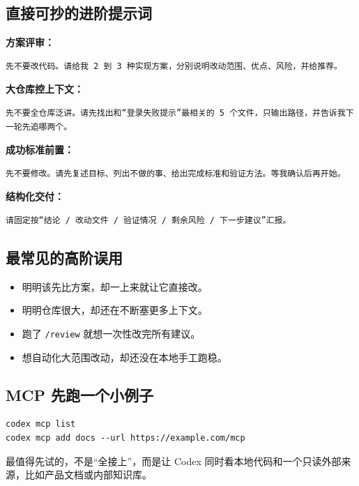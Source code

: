 \documentclass[UTF8,a4paper,11pt]{ctexart}
\begin{document}
\subsection{直接可抄的进阶提示词}

\textbf{方案评审：}
\begin{lstlisting}[style=prompt]
先不要改代码。请给我 2 到 3 种实现方案，分别说明改动范围、优点、风险，并给推荐。
\end{lstlisting}

\textbf{大仓库控上下文：}
\begin{lstlisting}[style=prompt]
先不要全仓库泛讲。请先找出和“登录失败提示”最相关的 5 个文件，只输出路径，并告诉我下一轮先追哪两个。
\end{lstlisting}

\textbf{成功标准前置：}
\begin{lstlisting}[style=prompt]
先不要修改。请先复述目标、列出不做的事、给出完成标准和验证方法。等我确认后再开始。
\end{lstlisting}

\textbf{结构化交付：}
\begin{lstlisting}[style=prompt]
请固定按“结论 / 改动文件 / 验证情况 / 剩余风险 / 下一步建议”汇报。
\end{lstlisting}

\subsection{最常见的高阶误用}

\begin{itemize}
  \item 明明该先比方案，却一上来就让它直接改。
  \item 明明仓库很大，却还在不断塞更多上下文。
  \item 跑了 \texttt{/review} 就想一次性改完所有建议。
  \item 想自动化大范围改动，却还没在本地手工跑稳。
\end{itemize}

\subsection{MCP 先跑一个小例子}

\begin{lstlisting}[style=cli]
codex mcp list
codex mcp add docs --url https://example.com/mcp
\end{lstlisting}

最值得先试的，不是“全接上”，而是让 Codex 同时看本地代码和一个只读外部来源，比如产品文档或内部知识库。
\end{document}
